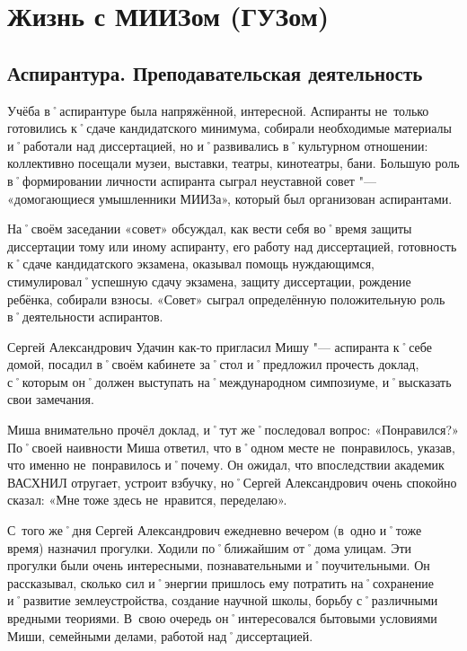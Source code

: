 ﻿\chapter{Жизнь с МИИЗом (ГУЗом)}

\section*{Аспирантура. Преподавательская деятельность}
\label{sec:aspirantura}

Учёба в˚аспирантуре была напряжённой, интересной. Аспиранты не~только готовились к˚сдаче кандидатского минимума, собирали необходимые материалы и˚работали над диссертацией, но и˚развивались в˚культурном отношении: коллективно посещали музеи, выставки, театры, кинотеатры, бани. Большую роль в˚формировании личности аспиранта сыграл неуставной совет "--- «домогающиеся умышленники МИИЗа», который был организован аспирантами. 

На˚своём заседании «совет» обсуждал, как вести себя во˚время защиты диссертации тому или иному аспиранту, его работу над диссертацией, готовность к˚сдаче кандидатского экзамена, оказывал помощь нуждающимся, стимулировал˚успешную сдачу экзамена, защиту диссертации, рождение ребёнка, собирали взносы. «Совет» сыграл определённую положительную роль в˚деятельности аспирантов. 	

Сергей Александрович Удачин как-то пригласил Мишу "--- аспиранта к˚себе домой, посадил в˚своём кабинете за˚стол и˚предложил прочесть доклад, с˚которым он˚должен выступать на˚международном симпозиуме, и˚высказать свои замечания.

Миша внимательно прочёл доклад, и˚тут же˚последовал вопрос: «Понравился?» По˚своей наивности Миша ответил, что в˚одном месте не~понравилось, указав, что именно не~понравилось и˚почему. Он ожидал, что впоследствии академик ВАСХНИЛ отругает, устроит взбучку, но˚Сергей Александрович очень спокойно сказал: «Мне тоже здесь не~нравится, переделаю».

С~того же˚дня Сергей Александрович ежедневно вечером (в~одно и˚тоже время) назначил прогулки. Ходили по˚ближайшим от˚дома улицам. Эти прогулки были очень интересными, познавательными и˚поучительными. Он рассказывал, сколько сил и˚энергии пришлось ему потратить на˚сохранение и˚развитие землеустройства, создание научной школы, борьбу с˚различными вредными теориями. В~свою очередь он˚интересовался бытовыми условиями Миши, семейными делами, работой над˚диссертацией.

